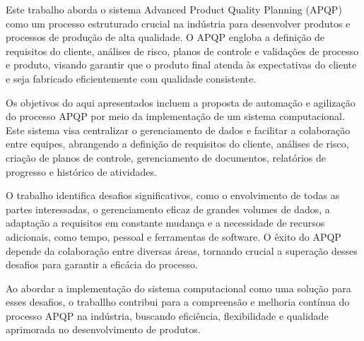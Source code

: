 Este trabalho aborda o sistema Advanced Product Quality Planning (APQP) como um processo estruturado crucial na indústria para desenvolver produtos e processos de produção de alta qualidade. O APQP engloba a definição de requisitos do cliente, análises de risco, planos de controle e validações de processo e produto, visando garantir que o produto final atenda às expectativas do cliente e seja fabricado eficientemente com qualidade consistente.

Os objetivos do aqui apresentados incluem a proposta de automação e agilização do processo APQP por meio da implementação de um sistema computacional. Este sistema visa centralizar o gerenciamento de dados e facilitar a colaboração entre equipes, abrangendo a definição de requisitos do cliente, análises de risco, criação de planos de controle, gerenciamento de documentos, relatórios de progresso e histórico de atividades. 

O trabalho identifica desafios significativos, como o envolvimento de todas as partes interessadas, o gerenciamento eficaz de grandes volumes de dados, a adaptação a requisitos em constante mudança e a necessidade de recursos adicionais, como tempo, pessoal e ferramentas de software. O êxito do APQP depende da colaboração entre diversas áreas, tornando crucial a superação desses desafios para garantir a eficácia do processo.

Ao abordar a implementação do sistema computacional como uma solução para esses desafios, o traballho contribui para a compreensão e melhoria contínua do processo APQP na indústria, buscando eficiência, flexibilidade e qualidade aprimorada no desenvolvimento de produtos.


